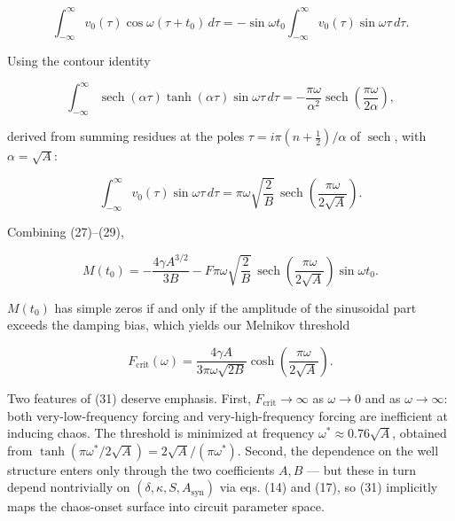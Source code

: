 \documentclass[11pt]{article}
\begin{document}
\begin{equation*}
\int_{-\infty}^{\infty} v_0(\tau)\cos\omega(\tau + t_0)\,d\tau = -\sin\omega t_0\int_{-\infty}^{\infty} v_0(\tau)\sin\omega\tau\,d\tau.
\end{equation*}

Using the contour identity

\begin{equation*}
\int_{-\infty}^{\infty} \operatorname{sech}(\alpha\tau)\tanh(\alpha\tau)\sin\omega\tau\,d\tau = -\frac{\pi\omega}{\alpha^2}\operatorname{sech}\!\left(\frac{\pi\omega}{2\alpha}\right),
\end{equation*}

derived from summing residues at the poles $\tau = i\pi(n + \tfrac{1}{2})/\alpha$ of $\operatorname{sech}$, with $\alpha = \sqrt{A}$:

\begin{equation}
\int_{-\infty}^{\infty} v_0(\tau)\sin\omega\tau\,d\tau = \pi\omega\sqrt{\frac{2}{B}}\,\operatorname{sech}\!\left(\frac{\pi\omega}{2\sqrt{A}}\right).
\end{equation}

Combining (27)--(29),

\begin{equation}
\boxed{\;M(t_0) = -\frac{4\gamma A^{3/2}}{3B} - F\pi\omega\sqrt{\frac{2}{B}}\,\operatorname{sech}\!\left(\frac{\pi\omega}{2\sqrt{A}}\right)\sin\omega t_0.\;}
\end{equation}

$M(t_0)$ has simple zeros if and only if the amplitude of the sinusoidal part exceeds the damping bias, which yields our Melnikov threshold

\begin{equation}
\boxed{\;F_{\text{crit}}(\omega) = \frac{4\gamma A}{3\pi\omega\sqrt{2B}}\cosh\!\left(\frac{\pi\omega}{2\sqrt{A}}\right).\;}
\end{equation}

Two features of (31) deserve emphasis. First, $F_{\text{crit}} \to \infty$ as $\omega \to 0$ and as $\omega \to \infty$: both very-low-frequency forcing and very-high-frequency forcing are inefficient at inducing chaos. The threshold is minimized at frequency $\omega^* \approx 0.76\sqrt{A}$, obtained from $\tanh(\pi\omega^*/2\sqrt{A}) = 2\sqrt{A}/(\pi\omega^*)$. Second, the dependence on the well structure enters only through the two coefficients $A, B$ --- but these in turn depend nontrivially on $(\delta, \kappa, S, A_{\text{syn}})$ via eqs. (14) and (17), so (31) implicitly maps the chaos-onset surface into circuit parameter space.
\end{document}
